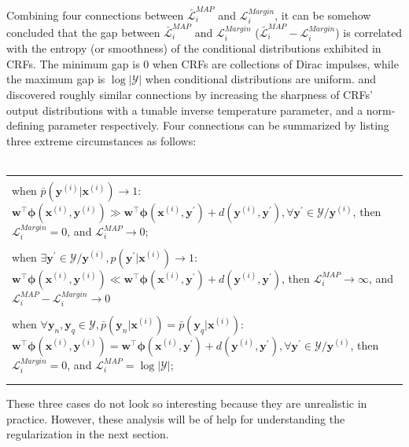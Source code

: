 Combining four connections between $\bar{\mathcal{L}}^{MAP}_i$ and $\mathcal{L}^{Margin}_i$, it can be somehow concluded that the gap between $\bar{\mathcal{L}}^{MAP}_i$ and $\mathcal{L}^{Margin}_i$ ($\bar{\mathcal{L}}^{MAP}_i-\mathcal{L}^{Margin}_i$) is correlated 
with the entropy (or smoothness) of the 
conditional distributions exhibited in CRFs. The minimum gap is 0 when CRFs are collections of Dirac impulses, while the maximum gap is $\log|\mathcal{Y}|$ when conditional distributions 
are uniform.  
\cite{MaxEnt} and \cite{Norm_Partition} discovered roughly similar connections by increasing the sharpness of CRFs' output distributions with a tunable inverse temperature parameter, and a norm-defining 
parameter respectively. Four connections can be summarized by listing three extreme circumstances as follows: \\ \\
\begin{tabular}{m{15cm}}
      \Xhline{3\arrayrulewidth} \\ 
      when $\bar p(\mathbf{y}^{(i)}|\mathbf{x}^{(i)})\to 1$: $\mathbf{w}^\top \boldsymbol\phi(\mathbf{x}^{(i)},\mathbf{y}^{(i)})\gg \mathbf{w}^\top \boldsymbol\phi(\mathbf{x}^{(i)},\mathbf{y}^\prime)
        +d(\mathbf{y}^{(i)},\mathbf{y}^\prime), 
        \forall \mathbf{y}^\prime\in\mathcal{Y}/\mathbf{y}^{(i)}$, then $\mathcal{L}_i^{Margin}=0$, and $\mathcal{L}_i^{MAP}\to 0$;  \\ \\
      when $\exists \mathbf{y}^\prime\in\mathcal{Y}/\mathbf{y}^{(i)}, p(\mathbf{y}^\prime|\mathbf{x}^{(i)})\to 1$: $\mathbf{w}^\top \boldsymbol\phi(\mathbf{x}^{(i)},\mathbf{y}^{(i)})\ll \mathbf{w}^\top \boldsymbol\phi(\mathbf{x}^{(i)},\mathbf{y}^\prime)
        +d(\mathbf{y}^{(i)},\mathbf{y}^\prime)$, then $\mathcal{L}_i^{MAP}\to \infty$, and $\mathcal{L}_i^{MAP}-\mathcal{L}_i^{Margin}\to 0$ \\
      \Xhline{3\arrayrulewidth} \\
when $\forall \mathbf{y}_n, \mathbf{y}_q\in\mathcal{Y}, \bar p(\mathbf{y}_n|\mathbf{x}^{(i)})=\bar p(\mathbf{y}_q|\mathbf{x}^{(i)})$: $\mathbf{w}^\top \boldsymbol\phi(\mathbf{x}^{(i)},
        \mathbf{y}^{(i)})=\mathbf{w}^\top \boldsymbol\phi(\mathbf{x}^{(i)},\mathbf{y}^\prime)
        +d(\mathbf{y}^{(i)},\mathbf{y}^\prime), 
        \forall \mathbf{y}^\prime\in\mathcal{Y}/\mathbf{y}^{(i)}$, then $\mathcal{L}_i^{Margin}=0$, and $\mathcal{L}_i^{MAP}=\log |\mathcal{Y}|$;  \\ \\
\Xhline{3\arrayrulewidth}
\end{tabular}
\newline 
\newline 
These three cases do not look so interesting because they are unrealistic in practice.
However, these analysis will be of help for understanding the regularization in the next section.   


